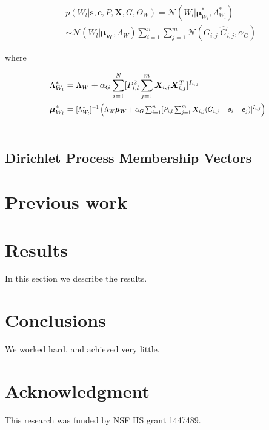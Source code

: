 \documentclass[10pt]{proc}
\begin{document}
\begin{mdframed}[style=eqbox]
{\setlength{\mathindent}{0cm}
\begin{equation} \label{cpd-W}
\begin{aligned}
    &p(W_l | \bm{s}, \bm{c}, P, \bm{X}, G, \Theta_W) =
        \mathcal{N}(W_l | \bm{\mu}_{W_l}^*, \Lambda_{W_l}^*) \\
        & \sim \mathcal{N}(W_l | \bm{\mu_W}, \Lambda_W)
            \sum_{i=1}^n \sum_{j=1}^m
                \mathcal{N}(G_{i,j} | \hat{G}_{i,j}, \alpha_G)
\end{aligned}
\end{equation}

where

\begin{align}
    \Lambda_{W_l}^* &= \begin{aligned}[t]
    \Lambda_W + \alpha_G \sum_{i=1}^N
        [ P_{i,l}^2 \sum_{j=1}^m
            \bm{X}_{i,j} \bm{X}_{i,j}^T ]^{I_{i,j}}
    \end{aligned}\\
%
    \bm{\mu}_{W_l}^* &= \begin{aligned}[t]
        \vstretch{0.9}{\hstretch{0.8}{
            [\Lambda_{W_l}^*]^{-1} \left(
                \Lambda_W\bm{\mu_W} +
                \alpha_G \sum_{i=1}^n
                    [P_{i,l} \sum_{j=1}^m
                        \bm{X}_{i,j}(G_{i,j} - \bm{s}_i - \bm{c}_j)
                    ]^{I_{i,j}}
            \right)}}
    \end{aligned}\\
    \nonumber
\end{align}}
\end{mdframed}

\subsection{Dirichlet Process Membership Vectors}


\section{Previous work}\label{previous work}


\section{Results}\label{results}
In this section we describe the results.


\section{Conclusions}\label{conclusions}
We worked hard, and achieved very little.


\section*{Acknowledgment}
This research was funded by NSF IIS grant 1447489.




\end{document}
